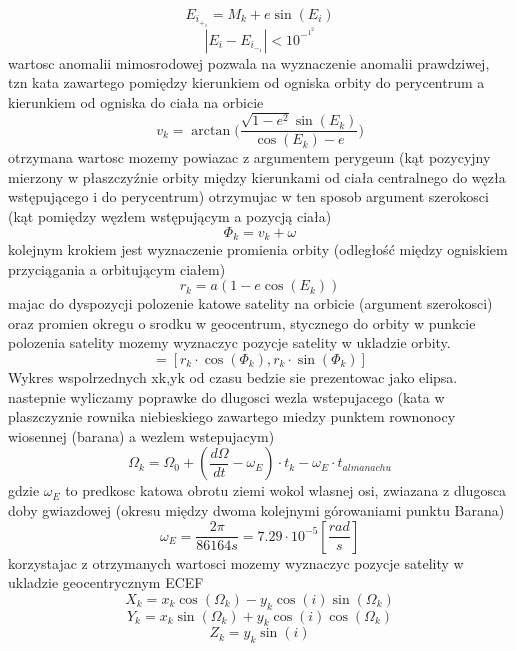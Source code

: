 \documentclass[twocolumn]{article}
\begin{document}
\begin{equation}
E_i_+_1=M_k+e\sin{(E_i)}
\end{equation}
\begin{equation}
|E_i-E_i_-_1|<10^-^1^2
\end{equation}
wartosc anomalii mimosrodowej pozwala na wyznaczenie anomalii prawdziwej, tzn kata zawartego pomiędzy kierunkiem od ogniska orbity do perycentrum a kierunkiem od ogniska do ciała na orbicie
\begin{equation}
v_k=\arctan{\Big(\frac{\sqrt{1-e^2}\sin{(E_k)}}{\cos{(E_k)}-e}\Big)}
\end{equation}
otrzymana wartosc mozemy powiazac z argumentem perygeum (kąt pozycyjny mierzony w płaszczyźnie orbity między kierunkami od ciała centralnego do węzła wstępującego i do perycentrum) otrzymujac w ten sposob argument szerokosci (kąt pomiędzy węzłem wstępującym a pozycją ciała)
\begin{equation}
\Phi_k=v_k+\omega
\end{equation}
kolejnym krokiem jest wyznaczenie promienia orbity (odległość między ogniskiem przyciągania a orbitującym ciałem)
\begin{equation}
r_k=a(1-e\cos{(E_k)})
\end{equation}
majac do dyspozycji polozenie katowe satelity na orbicie (argument szerokosci) oraz promien okregu o srodku w geocentrum, stycznego do orbity w punkcie polozenia satelity mozemy wyznaczyc pozycje satelity w ukladzie orbity.
\begin{equation}
[x_k,y_k]=[r_k\cdot\cos{(\Phi_k)},r_k\cdot\sin{(\Phi_k)}]
\end{equation}
Wykres wspolrzednych xk,yk od czasu bedzie sie prezentowac jako elipsa. nastepnie wyliczamy poprawke do dlugosci wezla wstepujacego (kata w plaszczyznie rownika niebieskiego zawartego miedzy punktem rownonocy wiosennej (barana) a wezlem wstepujacym)
\begin{equation}
\Omega_k=\Omega_0+(\frac{d\Omega}{dt}-\omega_E)\cdot t_k-\omega_E\cdot t_{almanachu}
\end{equation}
gdzie \(\omega_E\) to predkosc katowa obrotu ziemi wokol wlasnej osi, zwiazana z dlugosca doby gwiazdowej (okresu między dwoma kolejnymi górowaniami punktu Barana)
\begin{equation}
\omega_E = \frac{2\pi}{86164s}=7.29\cdot 10^{-5} \left[\frac{rad}{s}\right]
\end{equation}
korzystajac z otrzymanych wartosci mozemy wyznaczyc pozycje satelity w ukladzie geocentrycznym ECEF
\begin{equation}
X_k=x_k\cos{(\Omega_k)}-y_k\cos{(i)}\sin{(\Omega_k)}
\end{equation}
\begin{equation}
Y_k=x_k\sin{(\Omega_k)}+y_k\cos{(i)}\cos{(\Omega_k)}
\end{equation}
\begin{equation}
Z_k=y_k\sin{(i)}
\end{equation}
\end{document}
